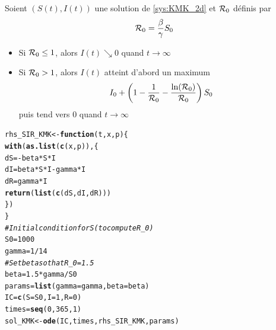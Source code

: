 \documentclass[aspectratio=169]{beamer}\usepackage[]{graphicx}\usepackage[]{xcolor}
\makeatletter
\newcommand{\hlnum}[1]{\textcolor[rgb]{0.686,0.059,0.569}{#1}}%
\newcommand{\hlcom}[1]{\textcolor[rgb]{0.678,0.584,0.686}{\textit{#1}}}%
\newcommand{\hlopt}[1]{\textcolor[rgb]{0,0,0}{#1}}%
\newcommand{\hldef}[1]{\textcolor[rgb]{0.345,0.345,0.345}{#1}}%
\newcommand{\hlkwa}[1]{\textcolor[rgb]{0.161,0.373,0.58}{\textbf{#1}}}%
\newcommand{\hlkwb}[1]{\textcolor[rgb]{0.69,0.353,0.396}{#1}}%
\newcommand{\hlkwc}[1]{\textcolor[rgb]{0.333,0.667,0.333}{#1}}%
\newcommand{\hlkwd}[1]{\textcolor[rgb]{0.737,0.353,0.396}{\textbf{#1}}}%
\newenvironment{kframe}{%
 \def\at@end@of@kframe{}%
 \ifinner\ifhmode%
  \def\at@end@of@kframe{\end{minipage}}%
  \begin{minipage}{\columnwidth}%
 \fi\fi%
 \def\FrameCommand##1{\hskip\@totalleftmargin \hskip-\fboxsep
 \colorbox{shadecolor}{##1}\hskip-\fboxsep
     \hskip-\linewidth \hskip-\@totalleftmargin \hskip\columnwidth}%
 \MakeFramed {\advance\hsize-\width
   \@totalleftmargin\z@ \linewidth\hsize
   \@setminipage}}%
 {\par\unskip\endMakeFramed%
 \at@end@of@kframe}
\newenvironment{knitrout}{}{} %
\makeatother
\begin{document}
\begin{frame}{}
  \begin{theorem}
    Soient $(S(t),I(t))$ une solution de \eqref{sys:KMK_2d} et $\mathcal{R}_0$ définis par
    \begin{equation}\label{eq:R0_KMK}
    \mathcal{R}_0=\frac{\beta}{\gamma}S_0
    \end{equation}
    \vfill
    \begin{itemize}
      \item Si $\mathcal{R}_0\leq 1$, alors $I(t)\searrow 0$ quand $t\to\infty$ 
      \item Si $\mathcal{R}_0>1$, alors $I(t)$ atteint d'abord un maximum 
      \begin{equation}\label{eq:max_I}
        I_0+\left(
      1-\frac{1}{\mathcal{R}_0} - \frac{\ln(\mathcal{R}_0)}{\mathcal{R}_0}
      \right)S_0
      \end{equation}
      puis tend vers 0 quand $t\to\infty$  
    \end{itemize}    
  \end{theorem}
\end{frame}

\begin{knitrout}
\color{fgcolor}\begin{kframe}
\begin{alltt}
\hldef{rhs_SIR_KMK} \hlkwb{<-} \hlkwa{function}\hldef{(}\hlkwc{t}\hldef{,} \hlkwc{x}\hldef{,} \hlkwc{p}\hldef{) \{}
  \hlkwd{with}\hldef{(}\hlkwd{as.list}\hldef{(}\hlkwd{c}\hldef{(x, p)), \{}
    \hldef{dS} \hlkwb{=} \hlopt{-} \hldef{beta} \hlopt{*} \hldef{S} \hlopt{*} \hldef{I}
    \hldef{dI} \hlkwb{=} \hldef{beta} \hlopt{*} \hldef{S} \hlopt{*} \hldef{I} \hlopt{-} \hldef{gamma} \hlopt{*} \hldef{I}
    \hldef{dR} \hlkwb{=} \hldef{gamma} \hlopt{*} \hldef{I}
    \hlkwd{return}\hldef{(}\hlkwd{list}\hldef{(}\hlkwd{c}\hldef{(dS, dI, dR)))}
  \hldef{\})}
\hldef{\}}
\hlcom{# Initial condition for S (to compute R_0)}
\hldef{S0} \hlkwb{=} \hlnum{1000}
\hldef{gamma} \hlkwb{=} \hlnum{1}\hlopt{/}\hlnum{14}
\hlcom{# Set beta so that R_0 = 1.5}
\hldef{beta} \hlkwb{=} \hlnum{1.5} \hlopt{*} \hldef{gamma} \hlopt{/} \hldef{S0}
\hldef{params} \hlkwb{=} \hlkwd{list}\hldef{(}\hlkwc{gamma} \hldef{= gamma,} \hlkwc{beta} \hldef{= beta)}
\hldef{IC} \hlkwb{=} \hlkwd{c}\hldef{(}\hlkwc{S} \hldef{= S0,} \hlkwc{I} \hldef{=} \hlnum{1}\hldef{,} \hlkwc{R} \hldef{=} \hlnum{0}\hldef{)}
\hldef{times} \hlkwb{=} \hlkwd{seq}\hldef{(}\hlnum{0}\hldef{,} \hlnum{365}\hldef{,} \hlnum{1}\hldef{)}
\hldef{sol_KMK} \hlkwb{<-} \hlkwd{ode}\hldef{(IC, times, rhs_SIR_KMK, params)}
\end{alltt}
\end{kframe}
\end{knitrout}
\end{document}

